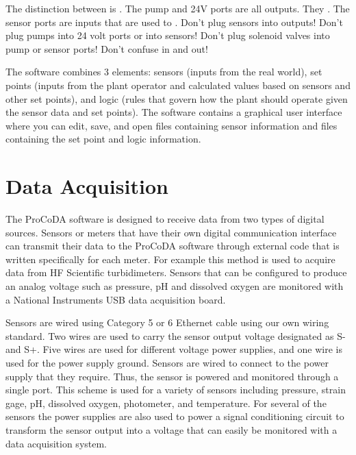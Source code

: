 \documentclass[letterpaper,10pt,english]{sphinxmanual}
\begin{document}
The distinction between  is . The pump and 24V ports are all outputs. They . The sensor ports are inputs that are used to . Don’t plug sensors into outputs! Don’t plug pumps into 24 volt ports or into sensors! Don’t plug solenoid valves into pump or sensor ports! Don’t confuse in and out!

The software combines 3 elements: sensors (inputs from the real world), set points (inputs from the plant operator and calculated values based on sensors and other set points), and logic (rules that govern how the plant should operate given the sensor data and set points). The software contains a graphical user interface where you can edit, save, and open files containing sensor information and files containing the set point and logic information.


\section{Data Acquisition}
\label{\detokenize{ProCoDA/ProCoDA:data-acquisition}}
The ProCoDA software is designed to receive data from two types of digital sources. Sensors or meters that have their own digital communication interface can transmit their data to the ProCoDA software through external code that is written specifically for each meter. For example this method is used to acquire data from HF Scientific turbidimeters. Sensors that can be configured to produce an analog voltage such as pressure, pH and dissolved oxygen are monitored with a National Instruments USB data acquisition board.

Sensors are wired using Category 5 or 6 Ethernet cable using our own {\hyperref[\detokenize{ProCoDA/ProCoDA:table-procoda-sensor-wiring}]{}} wiring standard. Two wires are used to carry the sensor output voltage designated as S- and S+. Five wires are used for different voltage power supplies, and one wire is used for the power supply ground. Sensors are wired to connect to the power supply that they require. Thus, the sensor is powered and monitored through a single port. This scheme is used for a variety of sensors including pressure, strain gage, pH, dissolved oxygen, photometer, and temperature. For several of the sensors the power supplies are also used to power a signal conditioning circuit to transform the sensor output into a voltage that can easily be monitored with a data acquisition system.
\end{document}

